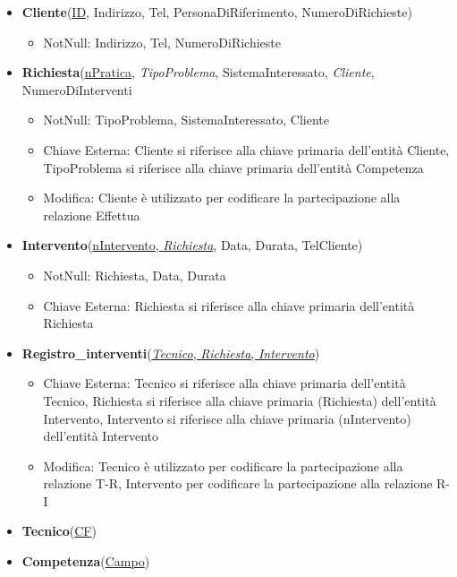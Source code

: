 \documentclass{article}
\begin{document}
\begin{itemize}
    \item \textbf{Cliente}(\underline{ID}, Indirizzo, Tel, PersonaDiRiferimento, NumeroDiRichieste) 
        \begin{itemize}
            \item NotNull: Indirizzo, Tel, NumeroDiRichieste
        \end{itemize}
    \item \textbf{Richiesta}(\underline{nPratica}, \textit{TipoProblema}, SistemaInteressato, \textit{Cliente}, NumeroDiInterventi
        \begin{itemize}
            \item NotNull: TipoProblema, SistemaInteressato, Cliente
            \item Chiave Esterna: Cliente si riferisce alla chiave primaria dell'entità Cliente, TipoProblema si riferisce alla chiave primaria dell'entità Competenza
            \item Modifica: Cliente è utilizzato per codificare la partecipazione alla relazione Effettua
        \end{itemize}
    \item \textbf{Intervento}(\underline{nIntervento, \textit{Richiesta}}, Data, Durata, TelCliente)
        \begin{itemize}
            \item NotNull: Richiesta, Data, Durata
            \item Chiave Esterna: Richiesta si riferisce alla chiave primaria dell'entità Richiesta
        \end{itemize}
    \item \textbf{Registro\_interventi}(\underline{\textit{Tecnico}, \textit{Richiesta}, \textit{Intervento}})
        \begin{itemize}
        \item Chiave Esterna: Tecnico si riferisce alla chiave primaria dell'entità Tecnico, Richiesta si riferisce alla chiave primaria (Richiesta) dell'entità Intervento, Intervento si riferisce alla chiave primaria (nIntervento) dell'entità Intervento
        \item Modifica: Tecnico è utilizzato per codificare la partecipazione alla relazione T-R, Intervento per codificare la partecipazione alla relazione R-I
        \end{itemize}
    \item \textbf{Tecnico}(\underline{CF})
    \item \textbf{Competenza}(\underline{Campo})
\end{itemize}
\end{document}
